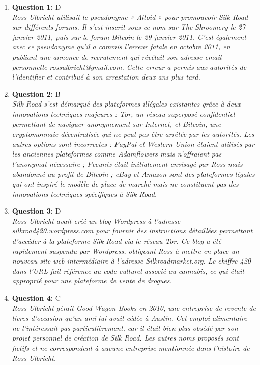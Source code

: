 \documentclass[12pt,a4paper]{article}
\begin{document}
\begin{enumerate}
\item \textbf{Question 1:} D
\\ \textit{Ross Ulbricht utilisait le pseudonyme « Altoid » pour promouvoir Silk Road sur différents forums. Il s'est inscrit sous ce nom sur The Shroomery le 27 janvier 2011, puis sur le forum Bitcoin le 29 janvier 2011. C'est également avec ce pseudonyme qu'il a commis l'erreur fatale en octobre 2011, en publiant une annonce de recrutement qui révélait son adresse email personnelle rossulbricht@gmail.com. Cette erreur a permis aux autorités de l'identifier et contribué à son arrestation deux ans plus tard.}

\item \textbf{Question 2:} B
\\ \textit{Silk Road s'est démarqué des plateformes illégales existantes grâce à deux innovations techniques majeures : Tor, un réseau superposé confidentiel permettant de naviguer anonymement sur Internet, et Bitcoin, une cryptomonnaie décentralisée qui ne peut pas être arrêtée par les autorités. Les autres options sont incorrectes : PayPal et Western Union étaient utilisés par les anciennes plateformes comme Adamflowers mais n'offraient pas l'anonymat nécessaire ; Pecunix était initialement envisagé par Ross mais abandonné au profit de Bitcoin ; eBay et Amazon sont des plateformes légales qui ont inspiré le modèle de place de marché mais ne constituent pas des innovations techniques spécifiques à Silk Road.}

\item \textbf{Question 3:} D
\\ \textit{Ross Ulbricht avait créé un blog Wordpress à l'adresse silkroad420.wordpress.com pour fournir des instructions détaillées permettant d'accéder à la plateforme Silk Road via le réseau Tor. Ce blog a été rapidement suspendu par Wordpress, obligeant Ross à mettre en place un nouveau site web intermédiaire à l'adresse Silkroadmarket.org. Le chiffre 420 dans l'URL fait référence au code culturel associé au cannabis, ce qui était approprié pour une plateforme de vente de drogues.}

\item \textbf{Question 4:} C
\\ \textit{Ross Ulbricht gérait Good Wagon Books en 2010, une entreprise de revente de livres d'occasion qu'un ami lui avait cédée à Austin. Cet emploi alimentaire ne l'intéressait pas particulièrement, car il était bien plus obsédé par son projet personnel de création de Silk Road. Les autres noms proposés sont fictifs et ne correspondent à aucune entreprise mentionnée dans l'histoire de Ross Ulbricht.}


\end{enumerate}
\end{document}
